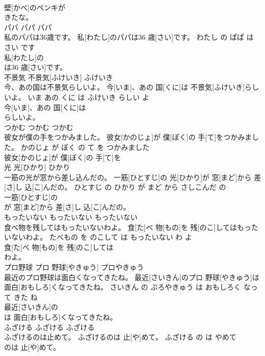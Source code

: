 \documentclass[8pt]{extreport}
\begin{document}
\begin{CJK}{UTF8}{min}
\\	壁[かべ]のペンキが
\\	きたな。			
\\	パパ	パパ	パパ	
\\	私のパパは36歳です。	私[わたし]のパパは36 歳[さい]です。	わたし の ぱぱ は 
\\	さい です	
\\	私[わたし]の
\\	は36 歳[さい]です。			
\\	不景気	不景気[ふけいき]	ふけいき	
\\	今、あの国は不景気らしいよ。	今[いま]、あの 国[くに]は 不景気[ふけいき]らしいよ。	いま あの くに は ふけいき らしい よ	
\\	今[いま]、あの 国[くに]は
\\	らしいよ。			
\\	つかむ	つかむ	つかむ	
\\	彼女が僕の手をつかみました。	彼女[かのじょ]が 僕[ぼく]の 手[て]をつかみました。	かのじょ が ぼく の て を つかみました	
\\	彼女[かのじょ]が 僕[ぼく]の 手[て]を
\\	光	光[ひかり]	ひかり	
\\	一筋の光が窓から差し込んだの。	一筋[ひとすじ]の 光[ひかり]が 窓[まど]から 差[さ]し 込[こ]んだの。	ひとすじ の ひかり が まど から さしこんだ の	
\\	一筋[ひとすじ]の
\\	が 窓[まど]から 差[さ]し 込[こ]んだの。			
\\	もったいない	もったいない	もったいない	
\\	食べ物を残してはもったいないわよ。	食[た]べ 物[もの]を 残[のこ]してはもったいないわよ。	たべもの を のこして は もったいない わ よ	
\\	食[た]べ 物[もの]を 残[のこ]しては
\\	わよ。			
\\	プロ野球	プロ 野球[やきゅう]	プロやきゅう	
\\	最近のプロ野球は面白くなってきたね。	最近[さいきん]のプロ 野球[やきゅう]は 面白[おもしろ]くなってきたね。	さいきん の ぷろやきゅう は おもしろく なって きた ね	
\\	最近[さいきん]の
\\	は 面白[おもしろ]くなってきたね。			
\\	ふざける	ふざける	ふざける	
\\	ふざけるのは止めて。	ふざけるのは 止[や]めて。	ふざける の は やめて	
\\	のは 止[や]めて。			

\end{CJK}
\end{document}

